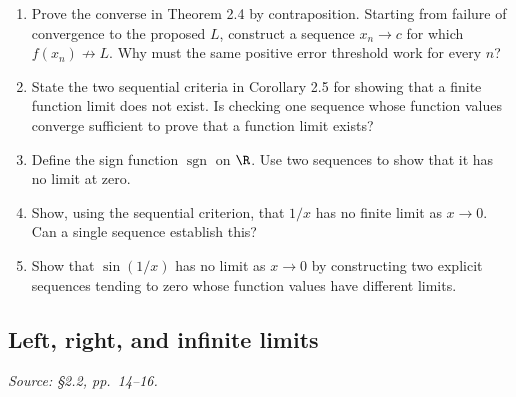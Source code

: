 \begin{enumerate}
  \item Prove the converse in Theorem 2.4 by contraposition.
    Starting from failure of convergence to the proposed \(L\), construct
    a sequence \(x_n\to c\) for which \(f(x_n)\not\to L\).
    Why must the same positive error threshold work for every \(n\)?

  \item State the two sequential criteria in Corollary 2.5 for showing
    that a finite function limit does not exist.
    Is checking one sequence whose function values converge sufficient
    to prove that a function limit exists?

  \item Define the sign function \(\operatorname{sgn}\) on \(\R\).
    Use two sequences to show that it has no limit at zero.

  \item Show, using the sequential criterion, that \(1/x\) has no
    finite limit as \(x\to0\). Can a single sequence establish this?

  \item Show that \(\sin(1/x)\) has no limit as \(x\to0\) by
    constructing two explicit sequences tending to zero whose function
    values have different limits.
\end{enumerate}

\subsection{Left, right, and infinite limits}
\textit{Source: \S2.2, pp.~14--16.}

